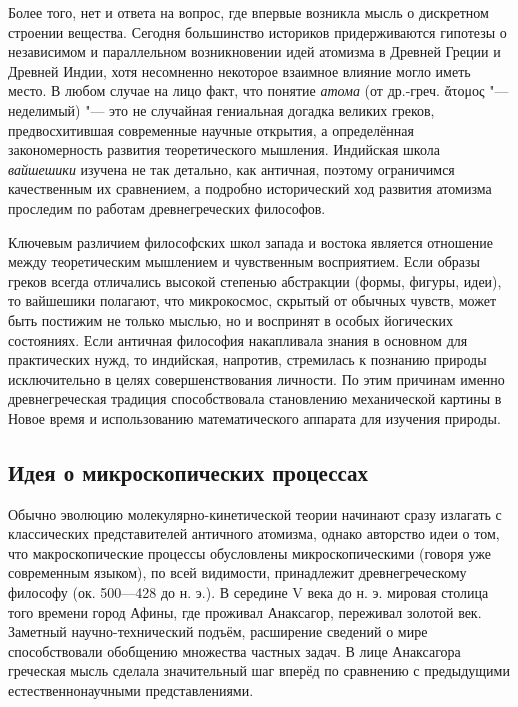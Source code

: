 \documentclass[a4paper, 12pt, oneside]{article} %
\begin{document}
Более того, нет и ответа на вопрос, где впервые возникла мысль о
дискретном строении вещества. Сегодня большинство историков
придерживаются гипотезы о независимом и параллельном возникновении идей
атомизма в Древней Греции и Древней Индии, хотя несомненно некоторое
взаимное влияние могло иметь место. В любом случае на лицо факт, что
понятие \emph{атома} (от др.-греч. \foreignlanguage{greek}{ἄτομος} "---
неделимый) "--- это не случайная гениальная догадка великих греков,
предвосхитившая современные научные открытия, а определённая
закономерность развития теоретического мышления. Индийская школа
\emph{вайшешики} изучена не так детально, как античная, поэтому
ограничимся качественным их сравнением, а подробно исторический ход
развития атомизма проследим по работам древнегреческих философов.

Ключевым различием философских школ запада и востока является отношение
между теоретическим мышлением и чувственным восприятием. Если образы
греков всегда отличались высокой степенью абстракции (формы, фигуры,
идеи), то вайшешики полагают, что микрокосмос, скрытый от обычных
чувств, может быть постижим не только мыслью, но и воспринят в особых
йогических состояниях. Если античная философия накапливала знания в
основном для практических нужд, то индийская, напротив, стремилась к
познанию природы исключительно в целях совершенствования личности. По
этим причинам именно древнегреческая традиция способствовала становлению
механической картины в Новое время и использованию математического
аппарата для изучения природы.

\subsection{Идея о микроскопических процессах}

Обычно эволюцию молекулярно-кинетической теории начинают сразу излагать
с классических представителей античного атомизма, однако авторство идеи
о том, что макроскопические процессы обусловлены микроскопическими
(говоря уже современным языком), по всей видимости, принадлежит
древнегреческому философу  (ок. 500---428 до н. э.).
В середине V века до н. э. мировая столица того времени город Афины, где
проживал Анаксагор, переживал золотой век. Заметный научно-технический
подъём, расширение сведений о мире способствовали обобщению множества
частных задач. В лице Анаксагора греческая мысль сделала значительный
шаг вперёд по сравнению с предыдущими естественнонаучными
представлениями.
\end{document}

